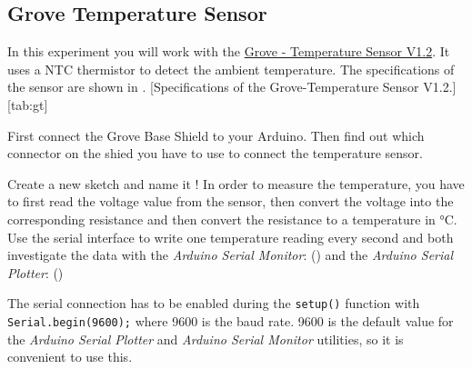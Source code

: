 \subsection{Grove Temperature Sensor}\label{sec:grovetemp}
In this experiment you will work with the \href{http://wiki.seeedstudio.com/Grove-Temperature_Sensor_V1.2/}{Grove - Temperature Sensor V1.2}. It uses a \ac{NTC} thermistor to detect the ambient temperature. The specifications of the sensor are shown in .
%
[Specifications of the Grove-Temperature Sensor V1.2.][tab:gt]
%
\begin{task}
  First connect the Grove Base Shield to your Arduino. Then find out which connector on the shied you have to use to connect the temperature sensor.
\end{task}
%
\begin{task}
  Create a new sketch and name it ! In order to measure the temperature, you have to first read the voltage value from the sensor, then convert the voltage into the corresponding resistance and then convert the resistance to a temperature in \si{\celsius}. Use the serial interface to write one temperature reading every second and both investigate the data with the \textit{Arduino Serial Monitor}:  () and the \textit{Arduino Serial Plotter}:  ()
\end{task}
%
\begin{note}
  The serial connection has to be enabled during the \texttt{setup()} function with \texttt{Serial.begin(9600);} where 9600 is the baud rate. 9600 is the default value for the \textit{Arduino Serial Plotter} and \textit{Arduino Serial Monitor} utilities, so it is convenient to use this.
\end{note}
%
